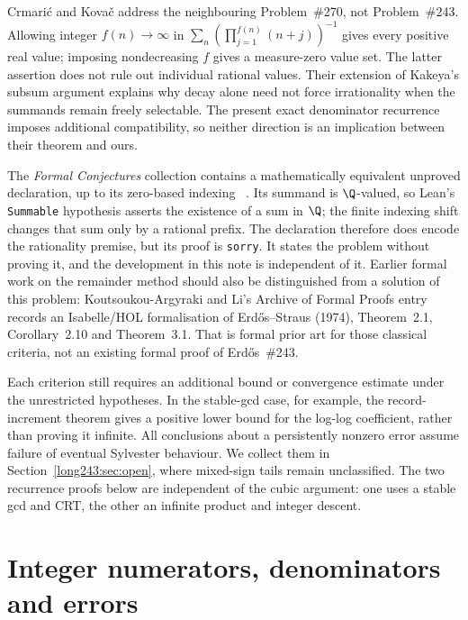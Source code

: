 Crmari\'{c} and Kova\v{c} \cite[Theorems~1--2]{crmarickovac2025}
address the neighbouring Problem~\#270, not Problem~\#243. Allowing integer
$f(n)\to\infty$ in $\sum_n(\prod_{j=1}^{f(n)}(n+j))^{-1}$ gives every
positive real value; imposing nondecreasing $f$ gives a measure-zero value
set. The latter assertion does not rule out individual rational values.
Their extension of Kakeya's subsum argument explains why decay alone need
not force irrationality when the summands remain freely selectable. The
present exact denominator recurrence imposes additional compatibility, so
neither direction is an implication between their theorem and ours.

The \emph{Formal Conjectures} collection contains a mathematically equivalent
unproved declaration, up to its zero-based indexing
~\cite{formalconjectures243}.  Its summand is $\Q$-valued, so Lean's
\texttt{Summable} hypothesis asserts the existence of a sum in $\Q$; the
finite indexing shift changes that sum only by a rational prefix.  The
declaration therefore does encode the rationality premise, but its proof is
\texttt{sorry}.  It states the problem without proving it, and the
development in this note is independent of it. Earlier formal work on the remainder method should also be
distinguished from a solution of this problem: Koutsoukou-Argyraki and Li's
Archive of Formal Proofs entry \cite{kouli2020} records an Isabelle/HOL
formalisation of Erd\H{o}s--Straus (1974), Theorem~2.1, Corollary~2.10 and
Theorem~3.1. That is formal prior art for those classical criteria, not an
existing formal proof of Erd\H{o}s~\#243.

Each criterion still requires an additional bound or convergence
estimate under the unrestricted hypotheses. In the stable-gcd case,
for example, the record-increment theorem gives a positive lower bound
for the log-log coefficient, rather than proving it infinite.
All conclusions about a persistently nonzero error assume failure of
eventual Sylvester behaviour. We collect them in
Section~\ref{long243:sec:open}, where mixed-sign tails remain
unclassified. The two recurrence proofs below are independent of the
cubic argument: one uses a stable gcd and CRT, the other an infinite
product and integer descent.

\section{Integer numerators, denominators and errors}\label{long243:sec:state}

